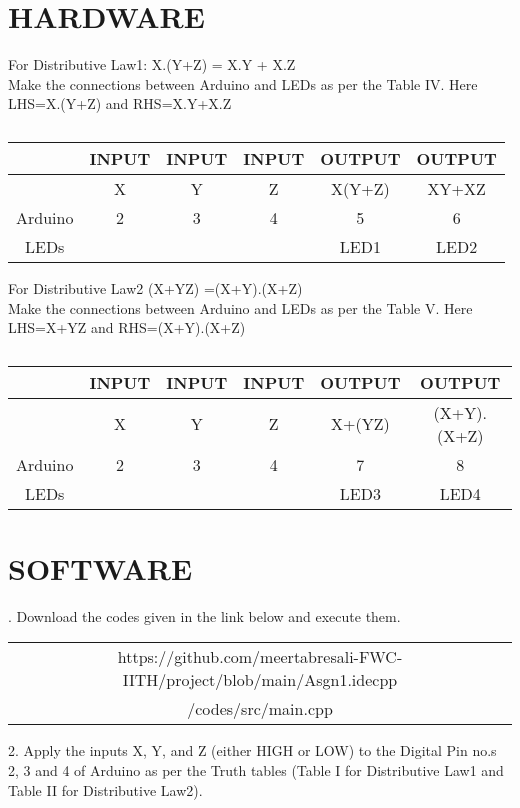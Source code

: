 \documentclass[conference]{IEEEtran}
\begin{document}
\section{HARDWARE}
\begin{flushleft}
For Distributive Law1: X.(Y+Z) = X.Y + X.Z \\
Make the connections between Arduino and LEDs as per the Table IV. Here LHS=X.(Y+Z) and RHS=X.Y+X.Z\\

\begin{table}[h]
\begin{tabular}{|c | c | c | c | c | c |} \hline
 & \textbf{INPUT} & \textbf{INPUT} & \textbf{INPUT} & \textbf{OUTPUT} & \textbf{OUTPUT} \\\hline
 & X & Y & Z & X(Y+Z) & XY+XZ \\ \hline
Arduino & 2 & 3 & 4 & 5 & 6 \\ \hline
LEDs &  &  &  & LED1 & LED2 \\ \hline
\end{tabular}
\caption{\label{tab:widgets}}
\end{table}
\end{flushleft}
\begin{flushleft}
For Distributive Law2 (X+YZ) =(X+Y).(X+Z) \\
Make the connections between Arduino and LEDs as per the Table V. Here LHS=X+YZ and RHS=(X+Y).(X+Z) \\
\end{flushleft}
\begin{table}[h]
\begin{tabular}{|c | c | c | c | c | c |} \hline
 & \textbf{INPUT} & \textbf{INPUT} & \textbf{INPUT} & \textbf{OUTPUT} & \textbf{OUTPUT} \\\hline
 & X & Y & Z & X+(YZ) & (X+Y).(X+Z) \\ \hline
Arduino & 2 & 3 & 4 & 7 & 8 \\ \hline
LEDs &  &  &  & LED3 & LED4 \\ \hline
\end{tabular}
\caption{\label{tab:widgets}}
\end{table}

\section{SOFTWARE}
. Download the codes given in the link below and execute them.\\

\begin{table}[h]
\centering
\begin{tabular}{| c |} \hline
 \rule{0pt}{20pt} https://github.com/meertabresali-FWC-IITH/project/blob/main/Asgn1.idecpp \\
 /codes/src/main.cpp \\\hline
\end{tabular}
\end{table}
\begin{flushleft}
2. Apply the inputs X, Y, and Z (either HIGH or LOW) to the Digital Pin no.s 2, 3 and 4 of Arduino as per the Truth tables (Table I for Distributive Law1 and Table II for Distributive Law2).
\end{flushleft}
\end{document}
